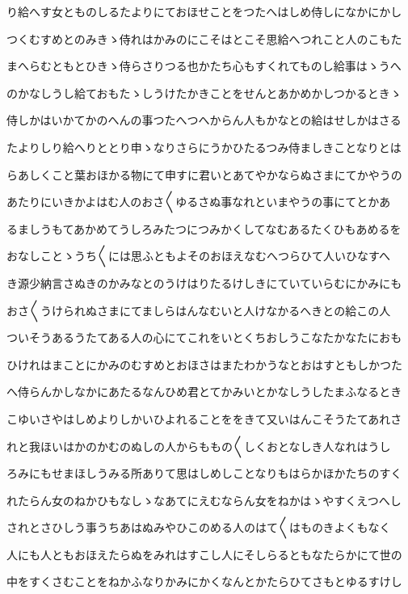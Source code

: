 \documentclass[a4paper,11pt,landscape]{ltjtarticle}
\begin{document}
り給へす女とものしるたよりにておほせことをつたへはしめ侍しになかにかし
\par\medskip
つくむすめとのみきゝ侍れはかみのにこそはとこそ思給へつれこと人のこもた
\par\medskip
まへらむともとひきゝ侍らさりつる也かたち心もすくれてものし給事はゝうへ
\par\medskip
のかなしうし給ておもたゝしうけたかきことをせんとあかめかしつかるときゝ
\par\medskip
侍しかはいかてかのへんの事つたへつへからん人もかなとの給はせしかはさる
\par\medskip
たよりしり給へりととり申ゝなりさらにうかひたるつみ侍ましきことなりとは
\par\medskip
らあしくこと葉おほかる物にて申すに君いとあてやかならぬさまにてかやうの
\par\medskip
あたりにいきかよはむ人のおさ〱ゆるさぬ事なれといまやうの事にてとかあ
\par\medskip
るましうもてあかめてうしろみたつにつみかくしてなむあるたくひもあめるを
\par\medskip
おなしことゝうち〱には思ふともよそのおほえなむへつらひて人いひなすへ
\par\medskip
き源少納言さぬきのかみなとのうけはりたるけしきにていていらむにかみにも
\par\medskip
おさ〱うけられぬさまにてましらはんなむいと人けなかるへきとの給この人
\par\medskip
ついそうあるうたてある人の心にてこれをいとくちおしうこなたかなたにおも
\par\medskip
ひけれはまことにかみのむすめとおほさはまたわかうなとおはすともしかつた
\par\medskip
へ侍らんかしなかにあたるなんひめ君とてかみいとかなしうしたまふなるとき
\par\medskip
こゆいさやはしめよりしかいひよれることををきて又いはんこそうたてあれさ
\par\medskip
れと我ほいはかのかむのぬしの人からももの〱しくおとなしき人なれはうし
\par\medskip
ろみにもせまほしうみる所ありて思はしめしことなりもはらかほかたちのすく
\par\medskip
れたらん女のねかひもなしゝなあてにえむならん女をねかはゝやすくえつへし
\par\medskip
されとさひしう事うちあはぬみやひこのめる人のはて〱はものきよくもなく
\par\medskip
人にも人ともおほえたらぬをみれはすこし人にそしらるともなたらかにて世の
\par\medskip
中をすくさむことをねかふなりかみにかくなんとかたらひてさもとゆるすけし
\end{document}
